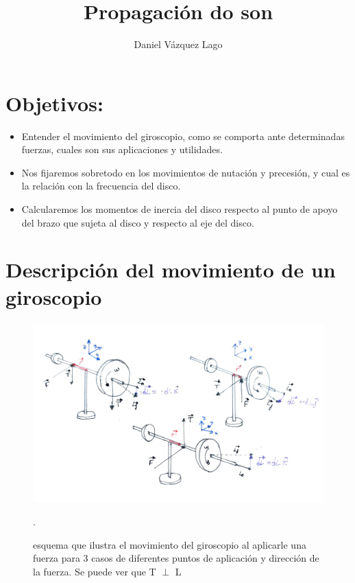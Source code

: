 \documentclass[12pt,a4paper]{article}
\author{Daniel Vázquez Lago}
\title{Propagación do son}
\begin{document}
\maketitle

\newpage

\tableofcontents

\newpage

\section{Objetivos:}

\begin{itemize}

\item Entender el movimiento del giroscopio, como se comporta ante determinadas fuerzas, cuales son sus aplicaciones y utilidades.

\item Nos fijaremos sobretodo en los movimientos de nutación y precesión, y cual es la relación con la frecuencia del disco. 

\item Calcularemos los momentos de inercia del disco respecto al punto de apoyo del brazo que sujeta al disco y respecto al eje del disco. 
 
\end{itemize}

\section{Descripción del movimiento de un giroscopio}
\begin{figure}[h!]
\centering
\includegraphics[scale=0.6]{xiroscopio.png}
\caption{esquema que ilustra el movimiento del giroscopio al aplicarle una fuerza para 3 casos de diferentes puntos de aplicación y dirección de la fuerza. Se puede ver que T $\perp$ L}.
\label{fig:zero}
\end{figure}
\end{document}
